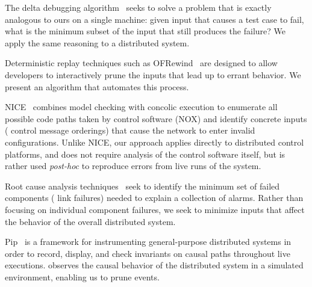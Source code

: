 
The delta debugging algorithm~\cite{Zeller:2002:SIF:506201.506206} seeks to solve
a problem that is exactly analogous to ours on a single machine: given input that causes a test case
to fail, what is the minimum subset of the input that still produces the failure?
We apply the same reasoning to a distributed system.


Deterministic replay techniques such as OFRewind~\cite{ofrewind}
are designed to allow developers to interactively prune
the inputs that lead up to errant behavior. We present an algorithm that
automates this process.


NICE~\cite{nice} combines model checking with concolic execution
to enumerate all possible code paths taken by control software (NOX)
and identify concrete inputs (\eg{} control message orderings) that cause
the network to enter invalid configurations. Unlike NICE, our approach
applies directly to distributed control platforms, and does not require analysis
of the control software itself, but is rather used {\em post-hoc} to
reproduce errors from live runs of the system.




Root cause analysis techniques~\cite{577079} seek to identify the minimum set of failed
components (\eg{} link failures) needed to explain a collection of alarms. Rather than
focusing on individual component failures, we seek to minimize inputs that affect the behavior
of the overall distributed system.


Pip~\cite{pip} is a framework for instrumenting general-purpose distributed systems
in order to record, display, and check invariants on causal paths throughout
live executions. \Simulator{} observes the causal behavior of the
distributed system in a simulated environment, enabling us to prune events.

%

